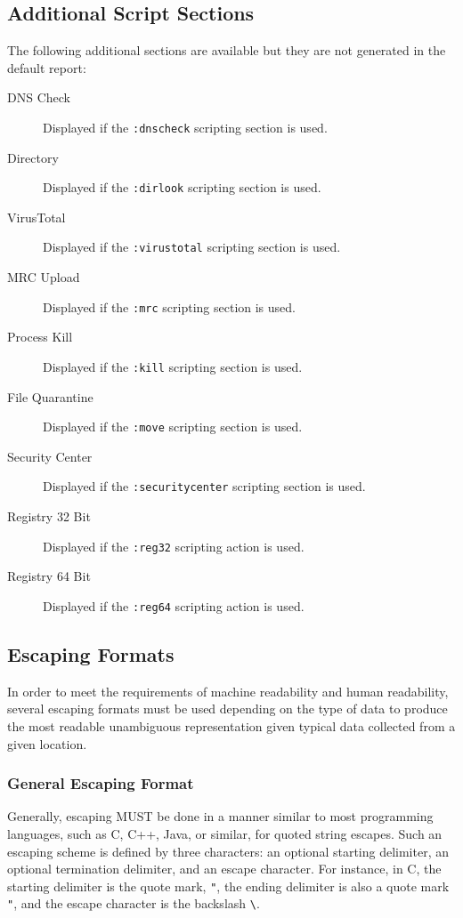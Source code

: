 \subsection{Additional Script Sections}
\noindent{}The following additional sections are available but they are not
generated in the default report:
\begin{description}
\item[DNS Check] Displayed if the \verb|:dnscheck| scripting section is used.
\item[Directory] Displayed if the \verb|:dirlook| scripting section is used.
\item[VirusTotal] Displayed if the \verb|:virustotal| scripting section is used.
\item[MRC Upload] Displayed if the \verb|:mrc| scripting section is used.
\item[Process Kill] Displayed if the \verb|:kill| scripting section is used.
\item[File Quarantine] Displayed if the \verb|:move| scripting section is used.
\item[Security Center] Displayed if the \verb|:securitycenter| scripting section
is used.
\item[Registry 32 Bit] Displayed if the \verb|:reg32| scripting action is used.
\item[Registry 64 Bit] Displayed if the \verb|:reg64| scripting action is used.
\end{description}

\subsection{Escaping Formats}
In order to meet the requirements of machine readability and human readability,
several escaping formats must be used depending on the type of data to produce
the most readable unambiguous representation given typical data collected from a
given location.

\subsubsection{General Escaping Format}
Generally, escaping MUST be done in a manner similar to most programming
languages, such as C, C++, Java, or similar, for quoted string escapes. Such an
escaping scheme is defined by three characters: an optional starting delimiter,
an optional termination delimiter, and an escape character. For instance, in C,
the starting delimiter is the quote mark, \verb|"|, the ending delimiter is also
a quote mark \verb|"|, and the escape character is the backslash \verb|\|.

